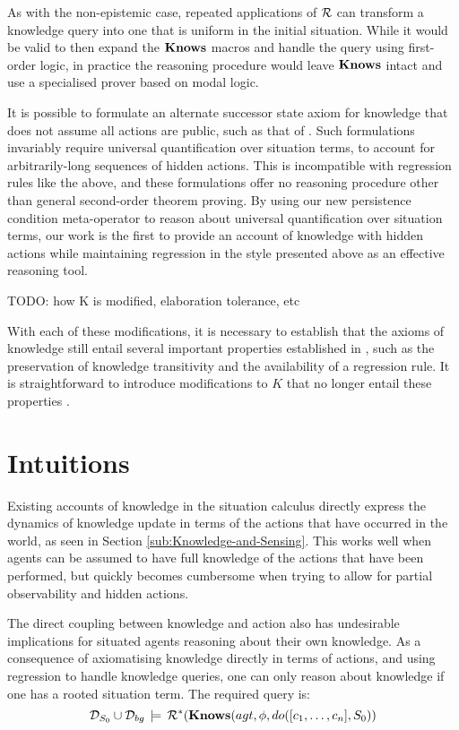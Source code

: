As with the non-epistemic case, repeated applications of $\mathcal{R}$ can
transform a knowledge query into one that is uniform in the initial
situation. While it would be valid to then expand the $\mathbf{Knows}$ macros
and handle the query using first-order logic, in practice the reasoning
procedure would leave $\mathbf{Knows}$ intact and use a specialised prover
based on modal logic.

It is possible to formulate an alternate successor state axiom for
knowledge that does not assume all actions are public, such as that
of \citet{Lesperance99sitcalc_approach}. Such formulations invariably
require universal quantification over situation terms, to account
for arbitrarily-long sequences of hidden actions. This is incompatible
with regression rules like the above, and these formulations offer
no reasoning procedure other than general second-order theorem proving.
By using our new persistence condition meta-operator to reason about
universal quantification over situation terms, our work is the first
to provide an account of knowledge with hidden actions while maintaining
regression in the style presented above as an effective reasoning
tool.

TODO: how K is modified, elaboration tolerance, etc

With each of these modifications, it is necessary to establish that
the axioms of knowledge still entail several important properties
established in \citep{scherl03sc_knowledge}, such as the preservation
of knowledge transitivity and the availability of a regression rule.
It is straightforward to introduce modifications to $K$ that no longer
entail these properties \citep{Petrick06thesis,Lesperance99sitcalc_approach}.


\section{Intuitions}

Existing accounts of knowledge in the situation calculus directly
express the dynamics of knowledge update in terms of the actions that
have occurred in the world, as seen in Section \ref{sub:Knowledge-and-Sensing}.
This works well when agents can be assumed to have full knowledge
of the actions that have been performed, but quickly becomes cumbersome
when trying to allow for partial observability and hidden actions.

The direct coupling between knowledge and action also has undesirable
implications for situated agents reasoning about their own knowledge.
As a consequence of axiomatising knowledge directly in terms of actions,
and using regression to handle knowledge queries, one can only reason
about knowledge if one has a rooted situation term. The required query
is:\[
\mathcal{D}_{S_{0}}\cup\mathcal{D}_{bg}\,\models\,\mathcal{R}^{*}(\mathbf{Knows}(agt,\phi,do([c_{1},\dots,c_{n}],S_{0}))\]


